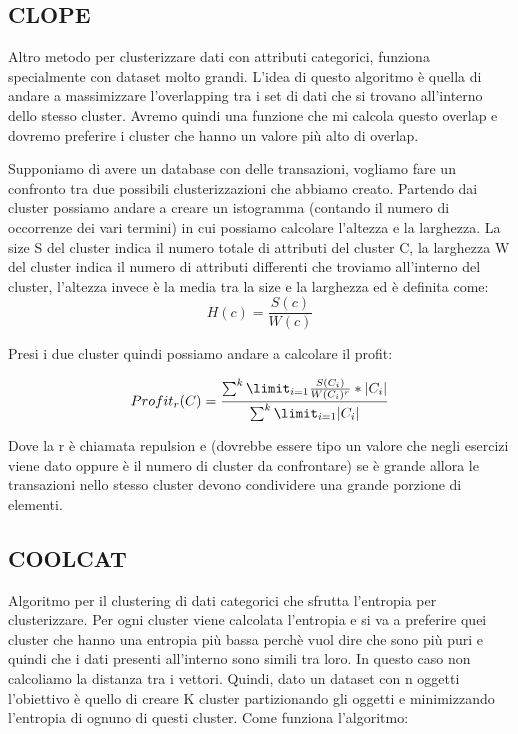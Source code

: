 \documentclass[14pt]{extreport}
\begin{document}
\subsection{CLOPE}

Altro metodo per clusterizzare dati con attributi categorici, funziona specialmente con dataset molto grandi.
L'idea di questo algoritmo è quella di andare a massimizzare l'overlapping tra i set di dati che si trovano all'interno dello stesso cluster. 
Avremo quindi una funzione che mi calcola questo overlap e dovremo preferire i cluster che hanno un valore più alto di overlap.

Supponiamo di avere un database con delle transazioni, vogliamo fare un confronto tra due possibili clusterizzazioni che abbiamo creato. Partendo dai cluster possiamo andare a creare un istogramma (contando il numero di occorrenze dei vari termini) in cui possiamo calcolare l'altezza e la larghezza.
La size S del cluster indica il numero totale di attributi del cluster C, la larghezza W del cluster indica il numero di attributi differenti che troviamo all'interno del cluster, l'altezza invece è la media tra la size e la larghezza ed è definita come: 
\begin{equation}
    H(c) = \frac{S(c)}{W(c)}
\end{equation}

Presi i due cluster quindi possiamo andare a calcolare il profit:

\begin{equation}
    Profit_r(C) = \frac{\sum^k \limit_{i=1} \frac{S(C_i)}{W(C_i)^r}* |C_i|}{\sum^k \limit_{i=1} |C_i|}
\end{equation}

Dove la r è chiamata repulsion e (dovrebbe essere tipo un valore che negli esercizi viene dato oppure è il numero di cluster da confrontare) se è grande allora le transazioni nello stesso cluster devono condividere una grande porzione di elementi.

\subsection{COOLCAT}

Algoritmo per il clustering di dati categorici che sfrutta l'entropia per clusterizzare. Per ogni cluster viene calcolata l'entropia e si va a preferire quei cluster che hanno una entropia più bassa perchè vuol dire che sono più puri e quindi che i dati presenti all'interno sono simili tra loro. In questo caso non calcoliamo la distanza tra i vettori.
Quindi, dato un dataset con n oggetti l'obiettivo è quello di creare K cluster partizionando gli oggetti e minimizzando l'entropia di ognuno di questi cluster.
Come funziona l'algoritmo:
\end{document}
